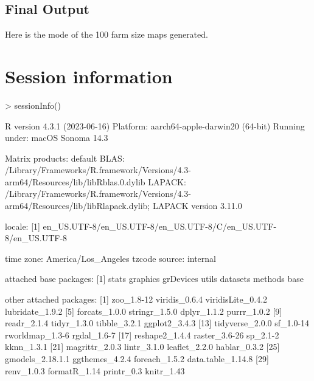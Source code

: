 \documentclass{article}
\begin{document}
\subsection{Final Output}

Here is the mode of the 100 farm size maps generated.


\newpage
\section*{Session information}

\begin{Schunk}
\begin{Sinput}
> sessionInfo()
\end{Sinput}
\begin{Soutput}
R version 4.3.1 (2023-06-16)
Platform: aarch64-apple-darwin20 (64-bit)
Running under: macOS Sonoma 14.3

Matrix products: default
BLAS:   /Library/Frameworks/R.framework/Versions/4.3-arm64/Resources/lib/libRblas.0.dylib 
LAPACK: /Library/Frameworks/R.framework/Versions/4.3-arm64/Resources/lib/libRlapack.dylib;  LAPACK version 3.11.0

locale:
[1] en_US.UTF-8/en_US.UTF-8/en_US.UTF-8/C/en_US.UTF-8/en_US.UTF-8

time zone: America/Los_Angeles
tzcode source: internal

attached base packages:
[1] stats     graphics  grDevices utils     datasets  methods   base     

other attached packages:
 [1] zoo_1.8-12        viridis_0.6.4     viridisLite_0.4.2 lubridate_1.9.2  
 [5] forcats_1.0.0     stringr_1.5.0     dplyr_1.1.2       purrr_1.0.2      
 [9] readr_2.1.4       tidyr_1.3.0       tibble_3.2.1      ggplot2_3.4.3    
[13] tidyverse_2.0.0   sf_1.0-14         rworldmap_1.3-6   rgdal_1.6-7      
[17] reshape2_1.4.4    raster_3.6-26     sp_2.1-2          kknn_1.3.1       
[21] magrittr_2.0.3    lintr_3.1.0       leaflet_2.2.0     hablar_0.3.2     
[25] gmodels_2.18.1.1  ggthemes_4.2.4    foreach_1.5.2     data.table_1.14.8
[29] renv_1.0.3        formatR_1.14      printr_0.3        knitr_1.43       


\end{Soutput}
\end{Schunk}
\end{document}
